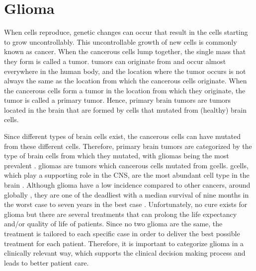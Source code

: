 \section{Glioma}

When cells reproduce, genetic changes can occur that result in the cells starting to grow uncontrollably.
This uncontrollable growth of new cells is commonly known as cancer.
When the cancerous cells lump together, the single mass that they form is called a \gls{tumor}.
\Glspl{tumor} can originate from and occur almost everywhere in the human body, and the location where the \gls{tumor} occurs is not always the same as the location from which the cancerous cells originate.
When the cancerous cells form a \gls{tumor} in the location from which they originate, the \gls{tumor} is called a primary \gls{tumor}.
Hence, primary brain \glspl{tumor} are \glspl{tumor} located in the brain that are formed by cells that mutated from (healthy) brain cells.

Since different types of brain cells exist, the cancerous cells can have mutated from these different cells.
Therefore, primary brain \glspl{tumor} are categorized by the type of brain cells from which they mutated, with \glspl{glioma} being the most prevalent \autocite{leece2017indicence}.
\Glspl{glioma} are \glspl{tumor} which cancerous cells mutated from \glspl{gcell}.
\Glspl{gcell}, which play a supporting role in the \acrlong{CNS}, are the most abundant cell type in the brain \autocite{jakel2017glial}.
Although \gls{glioma} have a low incidence compared to other cancers, around  globally \autocite{leece2017indicence}, they are one of the deadliest with a median survival of nine months in the worst case to seven years in the best case \autocite{ho2014incidence, hess2004gliomaincidence}.
Unfortunately, no cure exists for \gls{glioma} but there are several treatments that can prolong the life expectancy and/or quality of life of patients.
Since no two \gls{glioma} are the same, the treatment is tailored to each specific case in order to deliver the best possible treatment for each patient.
Therefore, it is important to categorize \gls{glioma} in a clinically relevant way, which supports the clinical decision making process and leads to better patient care.

